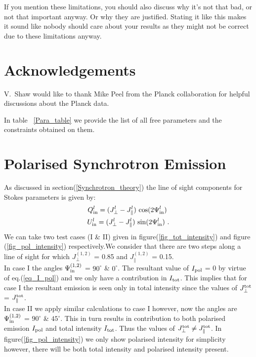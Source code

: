 \documentclass[usenatbib]{mnras}
\newcommand{\Arjen}[1]{{\color{brown}#1}}
\begin{document}
\Arjen{If you mention these limitations, you should also discuss why it's not that bad, or not that important anyway. Or why they are justified. Stating it like this makes it sound like nobody should care about your results as they might not be correct due to these limitations anyway.}



\section*{Acknowledgements}
V.~Shaw would like to thank Mike Peel from the Planck collaboration for helpful discussions about the Planck data.




\appendix


In table ~\ref{Para_table} we provide the list of all free parameters and the constraints obtained on them.

\section{Polarised Synchrotron Emission}
\label{Appendix_A}
As discussed in section(\ref{Synchrotron_theory}) the line of sight components for Stokes parameters is given by:
\begin{eqnarray}
Q^l_{\rm in} = ({J_{\perp}^l} - J_{\parallel}^l) \ {\cos}(2\Psi^l_{\rm in}) \ \\ U^l_{\rm in} = ({J_{\perp}^l} - J_{\parallel}^l) \ {\sin}(2\Psi^l_{\rm in}) \ .
\end{eqnarray}
We can take two test cases (I \& II) given in figure(\ref{fig_tot_intensity}) and figure (\ref{fig_pol_intensity}) respectively.We consider that there are two steps along a line of sight for which ${J_{\perp}^{(1,2)}}$ = 0.85 and $J_{\parallel}^{(1,2)}$  = 0.15. 
\\ In case I the angles $\Psi_{\rm in}^{(1,2)}$ = $90^{\circ}$ \& $0^{\circ}$. The resultant value of $I_{\rm pol}$ = 0 by virtue of eq.(\ref{eq_I_pol}) and we only have a contribution in $I_{\rm tot}$. This implies that for case I the resultant emission is seen only in total intensity since the values of $J_{\perp}^{\rm tot}$ = $J_{\parallel}^{\rm tot}$. 
\\ In case II we apply similar calculations to case I however, now the angles are $\Psi_{\rm in}^{(1,2)}$ = $90^{\circ}$ \& $45^{\circ}$. This in turn results in contribution to both polarised emission $I_{\rm pol}$ and total intensity $I_{\rm tot}$. Thus the values of $J_{\perp}^{\rm tot} \neq J_{\parallel}^{\rm tot}$. In figure(\ref{fig_pol_intensity}) we only show polarised intensity for simplicity however, there will be both total intensity and polarised intensity present.
\end{document}
